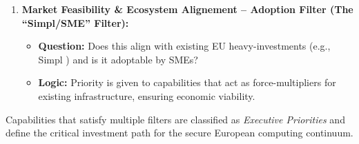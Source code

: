 \documentclass[12pt,a4paper]{article}
\begin{document}
\begin{enumerate}
\begin{itemize}
    \end{itemize}

    \item \textbf{Market Feasibility \& Ecosystem Alignement -- Adoption Filter (The ``Simpl/SME''  Filter):}
    \begin{itemize}
        \item \textbf{Question:} Does this align with existing EU heavy-investments (e.g., Simpl \cite{cloud_edge_roadmap}) and is it adoptable by SMEs?
        \item \textbf{Logic:} Priority is given to capabilities that act as force-multipliers for existing infrastructure, ensuring economic viability.
    \end{itemize}

\end{enumerate}

Capabilities that satisfy multiple filters are classified as \textit{Executive Priorities} and define the critical investment path for the secure European computing continuum.
\end{document}
